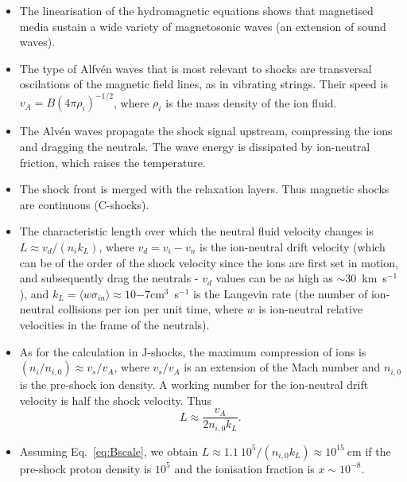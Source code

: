 \begin{itemize}

\item The linearisation of the hydromagnetic equations shows that
  magnetised media sustain a wide variety of magnetosonic waves (an
  extension of sound waves).

\item The type of Alfv\'en waves that is most relevant to shocks are
  transversal oscilations of the magnetic field lines, as in vibrating
  strings. Their speed is $v_A = B (4 \pi \rho_i)^{-1/2}$, where
  $\rho_i$ is the mass density of the ion fluid. 

\item The Alv\'en waves propagate the shock signal upstream,
  compressing the ions and dragging the neutrals. The wave energy is
  dissipated by ion-neutral friction, which raises the temperature. 

\item The shock front is merged with the relaxation layers. Thus
  magnetic shocks are continuous (C-shocks).

\end{itemize}



\begin{itemize}

\item The characteristic length over which the neutral fluid velocity
  changes is $L \approx v_d / (n_i k_L)$, where $v_d = v_i - v_n$ is
  the ion-neutral drift velocity (which can be of the order of the
  shock velocity since the ions are first set in motion, and
  subsequently drag the neutrals - $v_d$ values can be as high as
  $\sim$30~km~s$^{-1}$), and $k_L = \langle w \sigma_{in} \rangle
  \approx 10{-7}$cm$^{3}$~s$^{-1}$ is the Langevin rate (the number of
  ion-neutral collisions per ion per unit time, where $w$ is
  ion-neutral relative velocities in the frame of the neutrals).

\item As for the calculation in J-shocks, the maximum compression of
  ions is $(n_i / n_{i,0}) \approx v_s / v_A $, where $v_s/v_A$ is
  an extension of the Mach number and $n_{i,0}$ is the pre-shock ion
  density. A working number for the ion-neutral drift velocity is half
  the shock velocity.  Thus 
\[ L \approx \frac{v_A }{2 n_{i,0} k_L} .\]

\item Assuming Eq.~\ref{eq:Bscale}, we obtain $L \approx 1.1~10^5 /
  (n_{i,0} k_L) \approx 10^{15}~$cm if the pre-shock proton density is
  $10^5$ and the ionisation fraction is $x \sim 10^{-8}$. 


\end{itemize}


